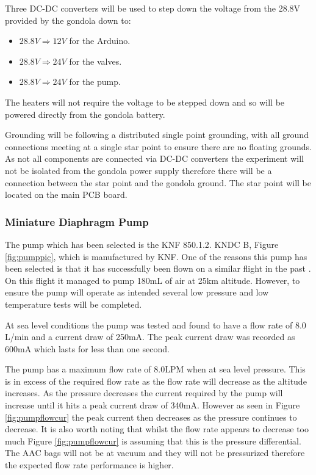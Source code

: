 \begin{centering}
Three DC-DC converters will be used to step down the voltage from the 28.8V provided by the gondola down to: 
\end{centering}

\begin{centering}
\begin{itemize}
  \item $28.8V \Longrightarrow 12V$ for the Arduino.  
  \item $28.8V \Longrightarrow 24V$ for the valves.
  \item $28.8V \Longrightarrow 24V$ for the pump.
  \end{itemize}

\end{centering}
\bigskip

\begin{centering}
The heaters will not require the voltage to be stepped down and so will be powered directly from the gondola battery.
\end{centering}
\bigskip

Grounding will be following a distributed single point grounding, with all ground connections meeting at a single star point to ensure there are no floating grounds. As not all components are connected via DC-DC converters the experiment will not be isolated from the gondola power supply therefore there will be a connection between the star point and the gondola ground. The star point will be located on the main PCB board.

\subsubsection{Miniature Diaphragm Pump}
The pump which has been selected is the KNF 850.1.2. KNDC B, Figure \ref{fig:pumppic}, which is manufactured by KNF. One of the reasons this pump has been selected is that it has successfully been flown on a similar flight in the past \cite{LISA}. On this flight it managed to pump 180mL of air at 25km altitude. However, to ensure the pump will operate as intended several low pressure and low temperature tests will be completed.

At sea level conditions the pump was tested and found to have a flow rate of 8.0 L/min and a current draw of 250mA. The peak current draw was recorded as 600mA which lasts for less than one second. 

The pump has a maximum flow rate of 8.0LPM when at sea level pressure. This is in excess of the required flow rate as the flow rate will decrease as the altitude increases. As the pressure decreases the current required by the pump will increase until it hits a peak current draw of 340mA. However as seen in Figure \ref{fig:pumpflowcur} the peak current then decreases as the pressure continues to decrease. It is also worth noting that whilst the flow rate appears to decrease too much Figure \ref{fig:pumpflowcur} is assuming that this is the pressure differential. The AAC bags will not be at vacuum and they will not be pressurized therefore the expected flow rate performance is higher.

